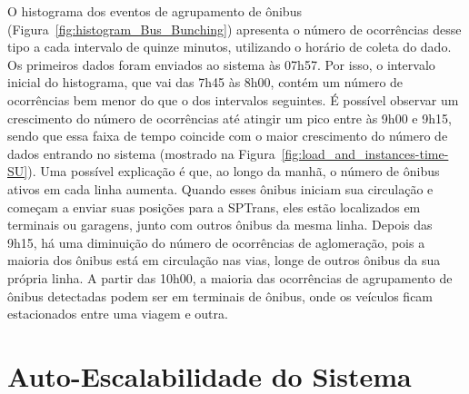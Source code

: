 


O histograma dos eventos de agrupamento de ônibus (Figura~\ref{fig:histogram_Bus_Bunching}) apresenta o número de ocorrências desse tipo a cada intervalo de quinze minutos, utilizando o horário de coleta do dado. Os primeiros dados foram enviados ao sistema às 07h57. Por isso, o  intervalo inicial do histograma, que vai das 7h45 às 8h00, contém um número de ocorrências bem menor do que o dos intervalos seguintes.
É possível observar um crescimento do número de ocorrências até atingir um pico entre às 9h00 e 9h15, sendo que essa faixa de tempo coincide com o maior crescimento do número de dados entrando no sistema (mostrado na Figura~\ref{fig:load_and_instances-time-SU}). Uma possível explicação é que, ao longo da manhã, o número de ônibus ativos em cada linha aumenta. Quando esses ônibus iniciam sua circulação e começam a enviar suas posições para a SPTrans, eles estão localizados em terminais ou garagens, junto com outros ônibus da mesma linha. Depois das 9h15, há uma diminuição do número de ocorrências de aglomeração, pois a maioria dos ônibus está em circulação nas vias, longe de outros ônibus da sua própria linha. A partir das 10h00, a maioria das ocorrências de agrupamento de ônibus detectadas podem ser em terminais de ônibus, onde os veículos ficam estacionados entre uma viagem e outra. 



\section{Auto-Escalabilidade do Sistema}
\label{sec:auto_scalability}




